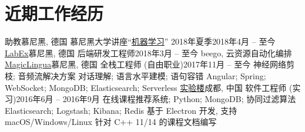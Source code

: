 \section{\textbf{近期工作经历}}
  \resumeSubHeadingListStart
    \resumeSubheading
      {助教}{慕尼黑, 德国}
      {慕尼黑大学讲座``\href{http://www.dbs.ifi.lmu.de/cms/studium_lehre/lehre_master/ml18/index.html}{机器学习}'' 2018年夏季}{2018年4月 -- 至今}
    \resumeSubheading
      {\href{https://labex.io/}{LabEx}}{慕尼黑, 德国}
      {后端研发工程师}{2018年3月 -- 至今}
      \resumeItemListStart
          {beego, 云资源自动化编排}
      \resumeItemListEnd
    \resumeSubheading
    {\href{https://magiclingua.com/}{MagicLingua}}{慕尼黑, 德国}
    {全栈工程师 (自由职业)}{2017年11月 -- 至今}
    \resumeItemListStart
        {神经网络剪枝; 音频流解决方案}
        {对话理解; 语言水平建模; 语句容错}
        {Angular; Spring; WebSocket; MongoDB; Elasticsearch; Serverless}
    \resumeItemListEnd
    \resumeSubheading
      {\href{https://shiyanlou.com/}{实验楼}}{成都, 中国}
      {软件工程师 (实习)}{2016年6月 -- 2016年9月}
      \resumeItemListStart
          {在线课程推荐系统; Python; MongoDB; 协同过滤算法}
          {Elasticsearch; Logstash; Kibana; Redis}
          {基于 Electron 开发, 支持 macOS/Windows/Linux}
          {针对 C++ 11/14 的课程文档编写}
      \resumeItemListEnd
  \resumeSubHeadingListEnd